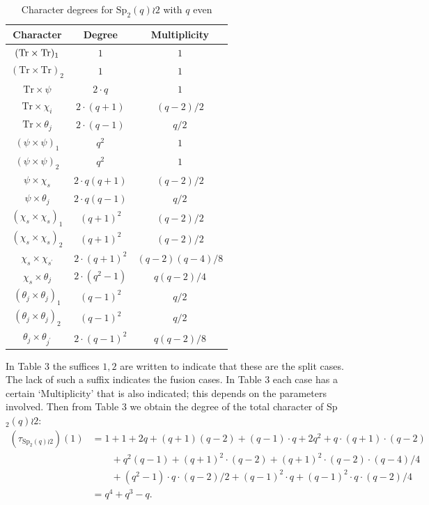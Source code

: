 \documentclass{amsart}
\begin{document}
\begin{table}[h!]
\label{chardegwreath}
\centering
\caption{Character degrees for $\mathrm{Sp}_2(q)\wr 2$ with $q$ even}
\vspace{5pt}
\begin{tabular}{c|cc}
Character & Degree & Multiplicity\\
\hline
$\vphantom{()^{2^2}}(\mathrm{ Tr}\times\mathrm{ Tr})_1$ & $1$ & $1$\\
$(\mathrm{ Tr}\times\mathrm{ Tr})_2$ & $1$ & $1$\\
$\mathrm{ Tr}\times\psi$ & $2\cdot q$ & $1$\\
$\mathrm{ Tr}\times\chi_i$ & $2\cdot(q+1)$ & $(q-2)/2$\\
$\mathrm{ Tr}\times\theta_j$ & $2\cdot (q-1)$ & $q/2$\\
$(\psi\times\psi)_1$ & $q^2$ & $1$\\
$(\psi\times\psi)_2$ & $q^2$ & $1$\\
$\psi\times\chi_s$ & $2\cdot q(q+1)$ & $(q-2)/2$\\
$\psi\times\theta_j$ & $2\cdot q(q-1)$ & $q/2$\\
$(\chi_s\times\chi_s)_1$ & $(q+1)^2$ & $(q-2)/2$\\
$(\chi_s\times\chi_s)_2$ & $(q+1)^2$ & $(q-2)/2$\\
$\chi_s\times\chi_{s^\prime}$ & $2\cdot (q+1)^2$ & $(q-2)(q-4)/8$\\
$\chi_s\times\theta_j$ & $2\cdot(q^2-1)$ & $q(q-2)/4$\\
$(\theta_j\times\theta_j)_1$ & $(q-1)^2$ & $q/2$\\
$(\theta_j\times\theta_j)_2$ & $(q-1)^2$ & $q/2$\\
$\theta_j\times\theta_{j^\prime}$ & $2\cdot (q-1)^2$ & $q(q-2)/8$
\end{tabular}
\end{table}

In Table 3 the suffices $1,2$ are written to indicate that these  are the split cases. The lack of such a suffix indicates the fusion cases. 
In Table 3 each case has a certain `Multiplicity' that is also indicated; this  depends on the parameters involved. 
Then from 
 Table 3 we obtain the degree of the total character of  Sp$_2(q)\wr 2$:
\begin{align*}
(\tau_{\mathrm{Sp}_2(q)\wr 2})(1)
&=1 + 1 + 2 q + (q + 1) (q - 2) + (q - 1) \cdot q + 2 q^2 + q\cdot(q + 1)\cdot (q - 2)\\ & \qquad + q^2 (q - 1)
 + (q + 1)^2 \cdot(q - 2) + (q + 1)^2\cdot (q - 2)\cdot (q - 4)/4\\& \qquad + (q^2 - 1)\cdot q\cdot (q - 2)/2 + (q - 1)^2\cdot q
 + (q - 1)^2\cdot q\cdot (q - 2)/4 \\&
= q^4+q^3-q.
\end{align*}
\end{document}
